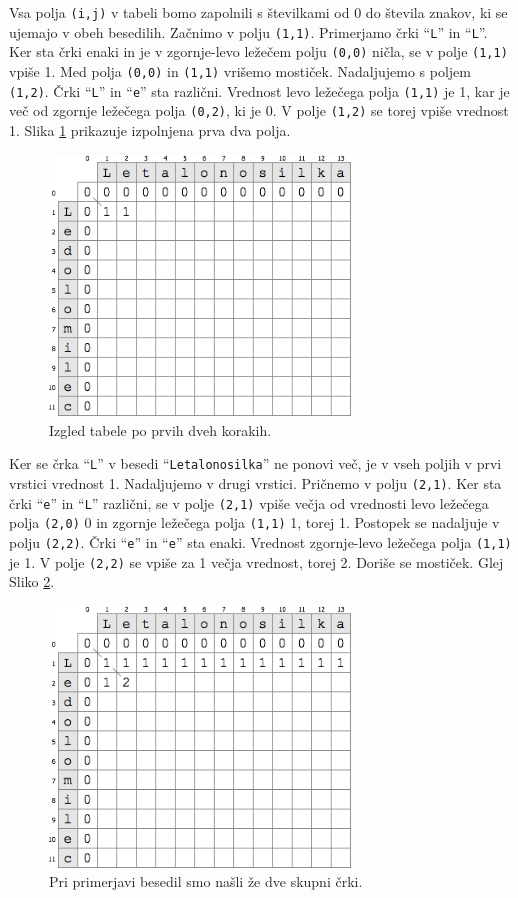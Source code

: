 \documentclass[a4paper, 12pt, twoside]{book}
\begin{document}
Vsa polja {\tt (i,j)} v tabeli bomo zapolnili s številkami od 0 do števila znakov, ki se ujemajo v obeh besedilih.
Začnimo v polju {\tt (1,1)}. Primerjamo črki “{\tt L}” in “{\tt L}”. Ker sta črki enaki in je v zgornje-levo ležečem polju {\tt (0,0)} ničla, se v polje {\tt (1,1)} vpiše 1. Med polja {\tt (0,0)} in {\tt (1,1)} vrišemo mostiček. Nadaljujemo s poljem {\tt (1,2)}. Črki “{\tt L}” in “{\tt e}” sta različni. Vrednost levo ležečega polja {\tt (1,1)} je 1, kar je več od zgornje ležečega polja {\tt (0,2)}, ki je 0. V polje {\tt (1,2)} se torej vpiše vrednost 1. Slika \ref{lcs2} prikazuje izpolnjena prva dva polja.

\begin{figure}[placement h]
\begin{center}
\includegraphics[width=8cm]{lcs2.png}
\end{center}
\caption{Izgled tabele po prvih dveh korakih.}
\label{lcs2}
\end{figure}

Ker se črka “{\tt L}” v besedi “{\tt Letalonosilka}” ne ponovi več, je v vseh poljih v prvi vrstici vrednost 1. Nadaljujemo v drugi vrstici. Pričnemo v polju {\tt (2,1)}. Ker sta črki “{\tt e}” in “{\tt L}” različni, se v polje {\tt (2,1)} vpiše večja od vrednosti levo ležečega polja {\tt (2,0)} 0 in zgornje ležečega polja {\tt (1,1)} 1, torej 1. Postopek se nadaljuje v polju {\tt (2,2)}. Črki “{\tt e}” in “{\tt e}” sta enaki. Vrednost zgornje-levo ležečega polja {\tt (1,1)} je 1. V polje {\tt (2,2)} se vpiše za 1 večja vrednost, torej 2. Doriše se mostiček. Glej Sliko \ref{lcs3}.

\begin{figure}[placement h]
\begin{center}
\includegraphics[width=8cm]{lcs3.png}
\end{center}
\caption{Pri primerjavi besedil smo našli že dve skupni črki.}
\label{lcs3}
\end{figure}
\end{document}
